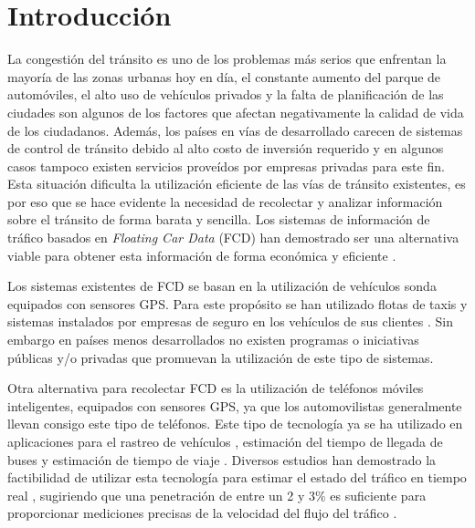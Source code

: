 \section{Introducción}

La congestión del tránsito es uno de los problemas más serios que enfrentan la mayoría de las zonas urbanas hoy en día, el constante aumento del parque de automóviles, el alto uso de vehículos privados y la falta de planificación de las ciudades son algunos de los factores que afectan negativamente la calidad de vida de los ciudadanos. Además, los países en vías de desarrollado carecen de sistemas de control de tránsito debido al alto costo de inversión requerido y en algunos casos tampoco existen servicios proveídos por empresas privadas para este fin. Esta situación dificulta la utilización eficiente de las vías de tránsito existentes, es por eso que se hace evidente la necesidad de recolectar y analizar información sobre el tránsito de forma barata y sencilla. Los sistemas de información de tráfico basados en \emph{Floating Car Data} (FCD) han demostrado ser una alternativa viable para obtener esta información de forma económica y eficiente \cite{schafer2002traffic,reinthaler2007evaluation}.

Los sistemas existentes de FCD se basan en la utilización de vehículos sonda equipados con sensores GPS. Para este propósito se han utilizado flotas de taxis \cite{schafer2002traffic,reinthaler2007evaluation} y sistemas instalados por empresas de seguro en los vehículos de sus clientes \cite{giovannini2011novel}. Sin embargo en países menos desarrollados no existen programas o iniciativas públicas y/o privadas que promuevan la utilización de este tipo de sistemas.

Otra alternativa para recolectar FCD es la utilización de teléfonos móviles inteligentes, equipados con sensores GPS, ya que los automovilistas generalmente llevan consigo este tipo de teléfonos. Este tipo de tecnología ya se ha utilizado en aplicaciones para el rastreo de vehículos \cite{thiagarajan2010cooperative}, estimación del tiempo de llegada de buses \cite{zhou2012long} y estimación de tiempo de viaje \cite{thiagarajan2009vtrack}. Diversos estudios han demostrado la factibilidad de utilizar esta tecnología para estimar el estado del tráfico en tiempo real \cite{tao2012real,herrera2010evaluation}, sugiriendo que una penetración de entre un 2 y 3\% es suficiente para proporcionar mediciones precisas de la velocidad del flujo del tráfico \cite{herrera2010evaluation}.

